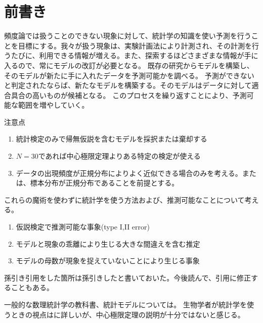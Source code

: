 
\section{前書き}\label{introduction}
頻度論では扱うことのできない現象に対して、統計学の知識を使い予測を行うことを目標にする。我々が扱う現象は、実験計画法により計測され、その計測を行うたびに、利用できる情報が増える。また、探索するほどさまざまな情報が手に入るので、常にモデルの改訂が必要となる。
既存の研究からモデルを構築し、そのモデルが新たに手に入れたデータを予測可能かを調べる。
予測ができないと判定されたならば、新たなモデルを構築する。そのモデルはデータに対して適合具合の高いものが候補となる。
このプロセスを繰り返すことにより、予測可能な範囲を増やしていく。




注意点
\begin{enumerate}
    \item 統計検定のみで帰無仮説を含むモデルを採択または棄却する
    \item $N=30$であれば中心極限定理よりある特定の検定が使える
    \item データの出現頻度が正規分布によりよく近似できる場合のみを考える。または、標本分布が正規分布であることを前提とする。
\end{enumerate}
これらの魔術を使わずに統計学を使う方法および、推測可能なことについて考える。

\begin{enumerate}
    \item 仮説検定で推測可能な事象(type I,II error)
    \item モデルと現象の乖離により生じる大きな間違えを含む推定
    \item モデルの母数が現象を捉えていないことにより生じる事象
\end{enumerate}
\fi

孫引き引用をした箇所は孫引きしたと書いておいた。今後読んで、引用に修正することもある。

一般的な数理統計学の教科書\cite{2012統計科学の基礎,199005数理統計,1973確率,1963数理統計学,2009統計的機械学習,2005確率と統計,2016統計学,2017現代数理統計学の基礎,2020現代数理統計学}、統計モデルについては\cite{2012データ解析のための統計モデリング入門}。
生物学者が統計学を使うときの視点は\cite{2018統計思考の世界}に詳しいが、中心極限定理の説明が十分ではないと感じる。

